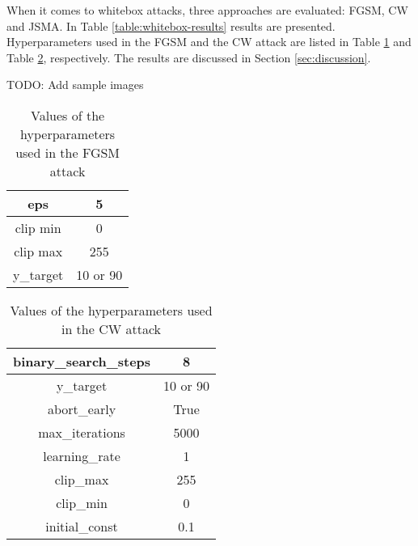 When it comes to whitebox attacks, three approaches are evaluated: FGSM, CW and JSMA. In Table \ref{table:whitebox-results} results are presented. Hyperparameters used in the FGSM and the CW attack are listed in Table \ref{table:fgsm-params} and Table \ref{table:cw-params}, respectively. The results are discussed in Section \ref{sec:discussion}. 

TODO: Add sample images

\begin{table}[]
\centering
\begin{tabular}{|c|c|}
\hline
eps & 5 \\  \hline
clip min & 0  \\ \hline
clip max & 255 \\ \hline
y\_target & 10 or 90 \\ \hline
\end{tabular}
\caption{Values of the hyperparameters used in the FGSM attack}
\label{table:fgsm-params}
\end{table}

\begin{table}[]
\centering
\begin{tabular}{|c|c|}
\hline
binary\_search\_steps & 8 \\ \hline
y\_target & 10 or 90 \\ \hline
abort\_early & True \\ \hline
max\_iterations & 5000 \\ \hline
learning\_rate & 1 \\ \hline
clip\_max & 255 \\ \hline
clip\_min & 0 \\ \hline
initial\_const & 0.1 \\ \hline
\end{tabular}
\caption{Values of the hyperparameters  used in the CW attack}
\label{table:cw-params}
\end{table}

